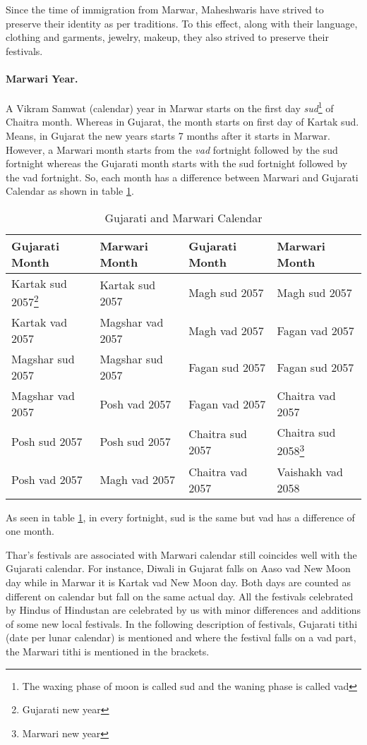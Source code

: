 Since the time of immigration from Marwar, Maheshwaris have strived to preserve
their identity as per traditions. To this effect, along with their language,
clothing and garments, jewelry, makeup, they also strived to preserve their
festivals.
\paragraph{Marwari Year.} A Vikram Samwat (calendar) year in Marwar starts on
the first day \textit{sud}\footnote{The waxing phase of moon is called sud and
the waning phase is called vad} of Chaitra month. Whereas in Gujarat, the month
starts on first day of Kartak sud. Means, in Gujarat the new years starts 7
months after it starts in Marwar. However, a Marwari month starts from the \textit{vad}
fortnight followed by the sud fortnight whereas the Gujarati month starts with
the sud fortnight followed by the vad fortnight.
So, each month has a difference between Marwari and Gujarati Calendar as shown
in table \ref{tblcal}.

\begin{table}
\begin{center}
\begin{tabular}{l|l|l|l}
\hline
\textbf{Gujarati Month} & \textbf{Marwari Month} & \textbf{Gujarati Month} &
\textbf{Marwari Month}\\ 
\hline
Kartak sud 2057\footnote{Gujarati new year} & Kartak sud 2057 & Magh sud 2057 & Magh sud 2057 \\
Kartak vad 2057 & Magshar vad 2057 & Magh vad 2057 & Fagan vad 2057 \\
Magshar sud 2057 & Magshar sud 2057 & Fagan sud 2057 & Fagan sud 2057 \\
Magshar vad 2057 & Posh vad 2057 & Fagan vad 2057 & Chaitra vad 2057 \\
Posh sud 2057 & Posh sud 2057 &Chaitra sud 2057 &Chaitra sud
2058\footnote{Marwari new year} \\
Posh vad 2057 & Magh vad 2057 & Chaitra vad 2057 & Vaishakh vad 2058 \\
\hline
\end{tabular}
\end{center}
\caption{Gujarati and Marwari Calendar}\label{tblcal}
\end{table}
As seen in table \ref{tblcal}, in every fortnight, sud is the same but vad has
a difference of one month.

Thar's festivals are associated with Marwari calendar still coincides well with
the Gujarati calendar. For instance, Diwali in Gujarat falls on Aaso vad New
Moon day while in Marwar it is Kartak vad New Moon day. Both days are counted as
different on calendar but fall on the same actual day. All the festivals
celebrated by Hindus of Hindustan are celebrated by us with minor differences
and additions of some new local festivals.
In the following description of festivals, Gujarati tithi (date per lunar calendar) is mentioned and where
the festival falls on a vad part, the Marwari tithi is mentioned in the
brackets.
